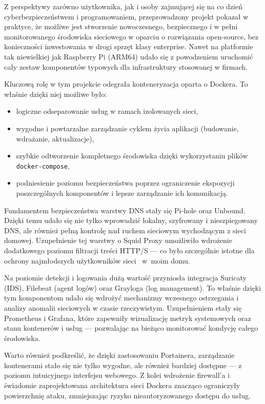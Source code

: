 \documentclass[
    left=2.5cm,         %
    right=2.5cm,        %
    top=2.5cm,          %
    bottom=3cm,         %
    bindingoffset=6mm,  %
    nohyphenation=true %
]{eiti/eiti-thesis} %
\begin{document}
Z perspektywy zarówno użytkownika, jak i osoby zajmującej się na co dzień cyberbezpieczeństwem i programowaniem, przeprowadzony projekt pokazał w praktyce, że możliwe jest stworzenie nowoczesnego, bezpiecznego i w pełni monitorowanego środowiska sieciowego w oparciu o rozwiązania open-source, bez konieczności inwestowania w drogi sprzęt klasy enterprise. Nawet na platformie tak niewielkiej jak Raspberry Pi (ARM64) udało się z powodzeniem uruchomić cały zestaw komponentów typowych dla infrastruktury stosowanej w firmach.

Kluczową rolę w tym projekcie odegrała konteneryzacja oparta o Dockera. To właśnie dzięki niej możliwe było:
\begin{itemize}
    \item logiczne odseparowanie usług w ramach izolowanych sieci,
    \item wygodne i powtarzalne zarządzanie cyklem życia aplikacji (budowanie, wdrażanie, aktualizacje),
    \item szybkie odtworzenie kompletnego środowiska dzięki wykorzystaniu plików \texttt{docker-compose},
    \item podniesienie poziomu bezpieczeństwa poprzez ograniczenie ekspozycji poszczególnych komponentów i lepsze zarządzanie ich komunikacją.
\end{itemize}

Fundamentem bezpieczeństwa warstwy DNS stały się Pi-hole oraz Unbound. Dzięki temu udało się nie tylko wprowadzić lokalny, szyfrowany i nieszpiegowany DNS, 
ale również pełną kontrolę nad ruchem sieciowym wychodzącym z sieci domowej. Uzupełnienie tej warstwy o Squid Proxy umożliwiło wdrożenie dodatkowego poziomu filtracji treści HTTP/S — co było szczególnie istotne dla ochrony najmłodszych użytkowników sieci ~w~moim domu.

Na poziomie detekcji i logowania dużą wartość przyniosła integracja Suricaty (IDS), Filebeat (agent logów) oraz Grayloga (log management). To właśnie dzięki 
tym komponentom udało się wdrożyć mechanizmy wczesnego ostrzegania i analizy anomalii sieciowych w czasie rzeczywistym. Uzupełnieniem stały się Prometheus i Grafana, które zapewniły wizualizację metryk systemowych oraz stanu kontenerów i usług — pozwalając na bieżąco monitorować kondycję całego środowiska.

Warto również podkreślić, że dzięki zastosowaniu Portainera, zarządzanie kontenerami stało się nie tylko wygodne, ale również bardziej dostępne — z poziomu intuicyjnego interfejsu webowego. Z kolei wdrożenie firewall’a i świadomie zaprojektowana architektura sieci Dockera znacząco ograniczyły powierzchnię ataku, zmniejszając ryzyko nieautoryzowanego dostępu do usług.
\end{document}
